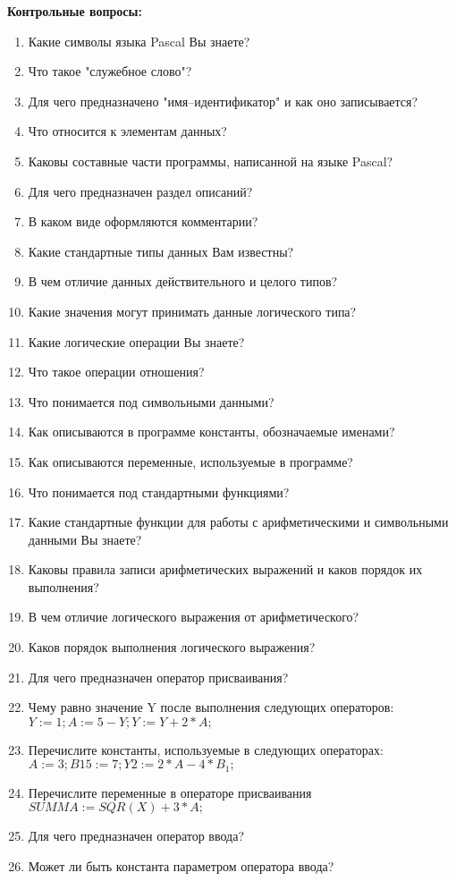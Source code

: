 {\bf Контрольные вопросы:}
\begin{enumerate}
\item Какие символы языка Pascal Вы знаете?
\item Что такое "служебное слово"? 
\item Для чего предназначено "имя--идентификатор" и как оно записывается?
\item Что относится к элементам данных? 
\item Каковы составные части программы, написанной на языке Pascal?
\item Для чего предназначен раздел описаний?
\item В каком виде оформляются комментарии?
\item Какие стандартные типы данных Вам известны?
\item В чем отличие данных действительного и целого типов?
\item Какие значения могут принимать данные логического типа?
\item Какие логические операции Вы знаете?
\item Что такое операции отношения?
\item Что понимается под символьными данными?
\item Как описываются в программе константы, обозначаемые именами?
\item Как описываются переменные, используемые в программе?
\item Что понимается под стандартными функциями?
\item Какие стандартные функции для работы с арифметическими и символьными данными Вы знаете?
\item Каковы правила записи арифметических выражений и каков порядок их выполнения?
\item В чем отличие логического выражения от арифметического?
\item Каков порядок выполнения логического выражения?
\item Для чего предназначен оператор присваивания?
\item Чему равно значение Y после выполнения следующих операторов: $Y:=1; A:=5 - Y; Y:=Y + 2*A;$
\item Перечислите константы, используемые в следующих опера­торах: $A:=3; B15:=7; Y2:=2*A - 4*B_1;$
\item Перечислите переменные в операторе присваивания
$SUMMA:= SQR(X) + 3*A;$
\item Для чего предназначен оператор ввода?
\item Может ли быть константа параметром оператора ввода?

\end{enumerate}
